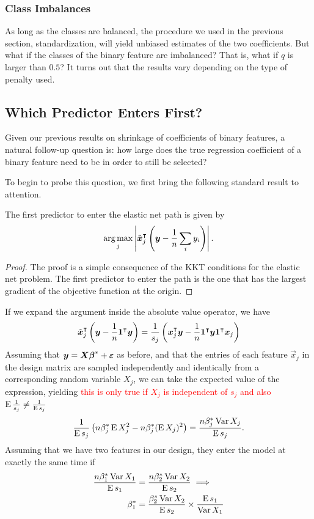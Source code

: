 \subsubsection{Class Imbalances}

As long as the classes are balanced, the procedure we used in the previous section, standardization, will yield unbiased estimates of the two coefficients. But what if the classes of the binary feature are imbalanced? That is, what if \(q\) is larger than \(0.5\)? It turns out that the results vary depending on the type of penalty used.

\subsection{Which Predictor Enters First?}

Given our previous results on shrinkage of coefficients of binary features, a natural follow-up question is: how large does the true regression coefficient of a binary feature need to be in order to still be selected?

To begin to probe this question, we first bring the following standard result to attention.

\begin{proposition}
  The first predictor to enter the elastic net path is given by
  \[
    \operatorname*{arg\,max}_j\left| \tilde{\boldsymbol{x}}_j^\intercal\left(\boldsymbol{y} - \frac{1}{n}\sum_i y_i \right)\right|.
  \]
\end{proposition}
\begin{proof}
  The proof is a simple consequence of the KKT conditions for the elastic net problem. The first predictor to enter the path is the one that has the largest gradient of the objective function at the origin.
\end{proof}

If we expand the argument inside the absolute value operator, we have
\[
  \tilde{\boldsymbol{x}}_j^\intercal\left( \boldsymbol{y} - \frac{1}{n}\boldsymbol{1}{}^\intercal \boldsymbol{y}\right) = \frac{1}{s_j}\left(\boldsymbol{x}_j^\intercal \boldsymbol{y} - \frac{1}{n}\boldsymbol{1}^\intercal \boldsymbol{y} \boldsymbol{1}^\intercal \boldsymbol{x}_j\right)
\]
Assuming that \(\boldsymbol{y} = \boldsymbol{X}\boldsymbol{\beta}^* + \boldsymbol{\varepsilon}\) as before, and that the entries of each feature \(\vec{x}_j\) in the design matrix are sampled independently and identically from a corresponding random variable \(X_j\), we can take the expected value of the expression, yielding \textcolor{red}{this is only true if $X_j$ is independent of $s_j$ and also $\operatorname{E} \frac{1}{s_j} \neq \frac{1}{\operatorname{E} s_j}$}
\[
  \frac{1}{\operatorname{E} s_j}\left( n \beta^*_j \operatorname{E} X_j^2 - n \beta^*_j (\operatorname{E} X_j)^2 \right) = \frac{n \beta^*_j\operatorname{Var} X_j}{\operatorname{E} s_j}.
\]
Assuming that we have two features in our design, they enter the model at exactly the same time if
\[
  \begin{aligned}
    \frac{n \beta^*_1\operatorname{Var} X_1}{\operatorname{E} s_1} & = \frac{n \beta^*_2\operatorname{Var} X_2}{\operatorname{E} s_2} \implies                     \\
    \beta^*_1                          & = \frac{\beta^*_2\operatorname{Var} X_2}{\operatorname{E} s_2} \times \frac{\operatorname{E} s_1}{\operatorname{Var} X_1}
  \end{aligned}
\]

